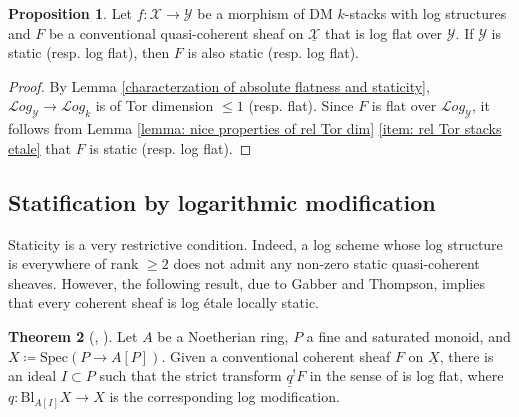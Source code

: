 \documentclass[11pt]{amsart}
\theoremstyle{definition}
\theoremstyle{definition}
\newtheorem{theorem}{Theorem}[subsection]
\newtheorem{proposition}[theorem]{Proposition}
\newtheorem{remark}[theorem]{Remark}
\newcommand{\ul}[1]{\underline{#1}}
\begin{document}
\begin{proposition}\label{proposition: log flat over static is static}
Let $f\colon \mathcal{X}\rightarrow \mathcal{Y}$ be a morphism of DM $k$-stacks with log structures and $F$ be a conventional quasi-coherent sheaf on $\ul{\mathcal{X}}$ that is log flat over $\mathcal{Y}$. If $\mathcal{Y}$ is static (resp. log flat), then $F$ is also static (resp. log flat). 
\end{proposition}
\begin{proof}
By Lemma \ref{characterzation of absolute flatness and staticity}, $\mathcal{L}og_\mathcal{Y}\rightarrow \mathcal{L}og_{k}$ is of Tor dimension $\leq 1$ (resp. flat). Since $F$ is flat over $\mathcal{L}og_\mathcal{Y}$, it follows from Lemma \ref{lemma: nice properties of rel Tor dim} \eqref{item: rel Tor stacks etale} that $F$ is static (resp. log flat).
\end{proof}
\subsection{Statification by logarithmic modification} 
Staticity is a very restrictive condition. Indeed, a log scheme whose log structure is everywhere of rank $\geq 2$ does not admit any non-zero static quasi-coherent sheaves. However, the following result, due to Gabber and Thompson, implies that every coherent sheaf is log \'etale locally static. 
\begin{theorem}[{\cite{GabberToricFlattening}, \cite[Theorem 3.3.4]{on-toric-log-schemes}}]\label{really technical theorem}
Let $A$ be a Noetherian ring, $P$ a fine and saturated monoid, and $X\coloneqq \text{Spec}(P\rightarrow A[P])$. Given a conventional coherent sheaf $F$ on $\underline{X}$,  there is an ideal $I\subset P$ such that the strict transform $\ul{q}^{!}F$ in the sense of \cite[080D]{stacks} is log flat, where $q\colon \text{Bl}_{A[I]}X\rightarrow X$ is the corresponding log modification.
\end{theorem}
\end{document}
